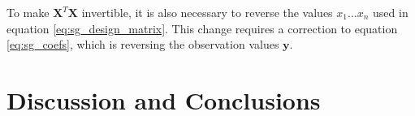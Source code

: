 To make $\mathbf{X}^T \mathbf{X}$ invertible,
it is also necessary to reverse the values $x_1 \ldots x_n$
used in equation \ref{eq:sg_design_matrix}.
This change requires a correction to equation \ref{eq:sg_coefs},
which is reversing the observation values $\mathbf{y}$.

\chapter{Discussion and Conclusions}
\label{chapter:discussion}


